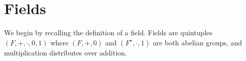 \section{Fields}

\begin{remark}
    We begin by recalling the definition of a field.
    Fields are quintuples \((F,+,\cdot,0,1)\) where
    \((F,+,0)\) and \((F^\star,\cdot,1)\) are both abelian groups,
    and multiplication distributes over addition.
\end{remark}
